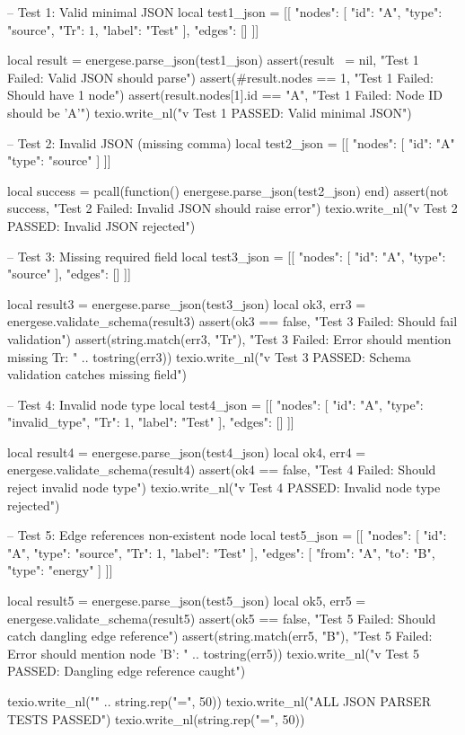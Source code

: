 \documentclass{article}
\begin{document}
\begin{luacode*}
    -- Test 1: Valid minimal JSON
    local test1_json = [[
    {
        "nodes": [
            {"id": "A", "type": "source", "Tr": 1, "label": "Test"}
        ],
        "edges": []
    }
    ]]

    local result = energese.parse_json(test1_json)
    assert(result ~= nil, "Test 1 Failed: Valid JSON should parse")
    assert(#result.nodes == 1, "Test 1 Failed: Should have 1 node")
    assert(result.nodes[1].id == "A", "Test 1 Failed: Node ID should be 'A'")
    texio.write_nl("v Test 1 PASSED: Valid minimal JSON")

    -- Test 2: Invalid JSON (missing comma)
    local test2_json = [[
    {
        "nodes": [
            {"id": "A" "type": "source"}
        ]
    }
    ]]

    local success = pcall(function() energese.parse_json(test2_json) end)
    assert(not success, "Test 2 Failed: Invalid JSON should raise error")
    texio.write_nl("v Test 2 PASSED: Invalid JSON rejected")

    -- Test 3: Missing required field
    local test3_json = [[
    {
        "nodes": [
            {"id": "A", "type": "source"}
        ],
        "edges": []
    }
    ]]

    local result3 = energese.parse_json(test3_json)
    local ok3, err3 = energese.validate_schema(result3)
    assert(ok3 == false, "Test 3 Failed: Should fail validation")
    assert(string.match(err3, "Tr"), "Test 3 Failed: Error should mention missing Tr: " .. tostring(err3))
    texio.write_nl("v Test 3 PASSED: Schema validation catches missing field")

    -- Test 4: Invalid node type
    local test4_json = [[
    {
        "nodes": [
            {"id": "A", "type": "invalid_type", "Tr": 1, "label": "Test"}
        ],
        "edges": []
    }
    ]]

    local result4 = energese.parse_json(test4_json)
    local ok4, err4 = energese.validate_schema(result4)
    assert(ok4 == false, "Test 4 Failed: Should reject invalid node type")
    texio.write_nl("v Test 4 PASSED: Invalid node type rejected")

    -- Test 5: Edge references non-existent node
    local test5_json = [[
    {
        "nodes": [
            {"id": "A", "type": "source", "Tr": 1, "label": "Test"}
        ],
        "edges": [
            {"from": "A", "to": "B", "type": "energy"}
        ]
    }
    ]]

    local result5 = energese.parse_json(test5_json)
    local ok5, err5 = energese.validate_schema(result5)
    assert(ok5 == false, "Test 5 Failed: Should catch dangling edge reference")
    assert(string.match(err5, "B"), "Test 5 Failed: Error should mention node 'B': " .. tostring(err5))
    texio.write_nl("v Test 5 PASSED: Dangling edge reference caught")

    texio.write_nl("\n" .. string.rep("=", 50))
    texio.write_nl("ALL JSON PARSER TESTS PASSED")
    texio.write_nl(string.rep("=", 50))
\end{luacode*}
\end{document}
